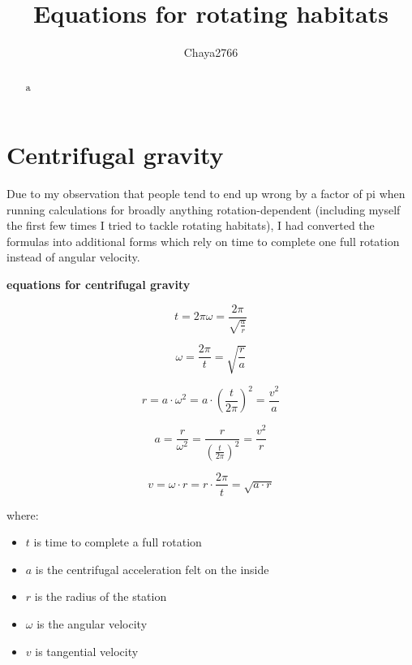 \documentclass[a4paper]{article}
\title{Equations for rotating habitats}
\author{Chaya2766}
\begin{document}
	\sffamily
	\sloppy
	
	\maketitle
	
	\vfill
	
	\begin{abstract}
		a
	\end{abstract}
	
	\vfill
	
	\tableofcontents
	
	\pagebreak
	
	\section{Centrifugal gravity}
	
	Due to my observation that people tend to end up wrong by a factor of pi when running calculations for broadly anything rotation-dependent (including myself the first few times I tried to tackle rotating habitats), I had converted the formulas into additional forms which rely on time to complete one full rotation instead of angular velocity.
	
	\begin{center}
		\textbf{equations for centrifugal gravity}
	\end{center}
	
	$$ t = 2\pi\omega = \frac{2 \pi}{\sqrt{\frac{a}{r}}} $$
	
	$$ \omega = \frac{2 \pi}{t} = \sqrt{\frac{r}{a}} $$
	
	$$ r = a \cdot \omega^2 = a \cdot \left( \frac{t}{2 \pi} \right)^2 = \frac{v^2}{a}$$
	
	$$ a = \frac{r}{\omega^2} = \frac{r}{\left( \frac{t}{2 \pi} \right)^2} = \frac{v^2}{r}$$
	
	$$ v = \omega \cdot r = r \cdot \frac{2 \pi}{t} = \sqrt{a \cdot r}$$
	
	where:
	
	\begin{itemize}
		\item $t$ is time to complete a full rotation
		
		\item $a$ is the centrifugal acceleration felt on the inside
		
		\item $r$ is the radius of the station
		
		\item $\omega$ is the angular velocity
		
		\item $v$ is tangential velocity
	\end{itemize}
	
\end{document}

